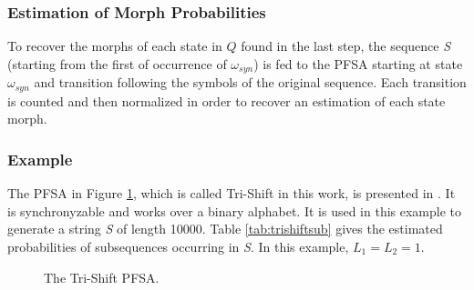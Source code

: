 {\subsubsection{Estimation of Morph Probabilities}

To recover the morphs of each state in $Q$ found in the last step, the sequence \textit{S} (starting from the first of occurrence of $\omega_{syn}$) is fed to the PFSA starting at state $\omega_{syn}$ and transition following the symbols of the original sequence. Each transition is counted and then normalized in order to recover an estimation of each state morph.

\subsubsection{Example}

The PFSA in Figure \ref{fig:trishift}, which is called Tri-Shift in this work, is presented in \citep{asok.11}. It is synchronyzable and works over a binary alphabet. It is used in this example to generate a string \textit{S} of length 10000. Table \ref{tab:trishiftsub} gives the estimated probabilities of subsequences occurring in \textit{S}. In this example, $L_1 = L_2 = 1$.

\begin{figure}
\centering
{}
\caption{The Tri-Shift PFSA.\label{fig:trishift}}
\end{figure}

}
